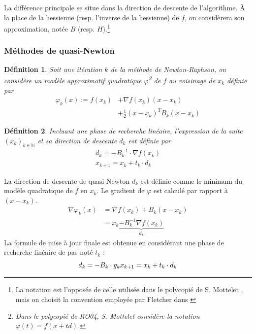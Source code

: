 \documentclass[3p, twocolumn]{elsarticle}
\newtheorem{definition}{Définition}[section]
\begin{document}
La différence principale se situe dans la direction de descente de l'algorithme. \`A la place de la hessienne (resp. l'inverse de la hessienne) de $f$, on considèrera son approximation, notée $B$ (resp. $H$).\footnote{La notation est l'opposée de celle utilisée dans le polycopié de S. Mottelet \cite{poly:mottelet2003}, mais on choisit la convention employée par Fletcher dans \cite{book:Fletcher_1987}}

\subsubsection{Méthodes de quasi-Newton}
\begin{definition}
    Soit une itération $k$ de la méthode de Newton-Raphson, on considère un modèle approximatif quadratique $\varphi$\footnote{Dans le polycopié de RO04, S. Mottelet \cite{poly:mottelet2003} considère la notation $\varphi(t) = f(x+td)$.} de $f$ au voisinage de $x_{k}$ définie par
    \begin{align}
        \varphi_k(x) := f(x_k) &+ \nabla f(x_k) (x - x_k)\nonumber\\ 
        &+ \frac12 (x-x_k)^T B_k (x-x_k)
        \label{eq:modele-quadra-qn}
    \end{align}
\end{definition}

\begin{definition}
    Incluant une phase de recherche linéaire, l'expression de la suite $(x_k)_{k\in \mathbb{N}}$ et sa direction de descente $d_k$ est définie par 
    \begin{align}
        d_k = -B_k^{-1}\cdot \nabla f(x_k)\nonumber \\
        x_{k+1} = x_k + t_k\cdot d_k
        \label{eq:suite-qn}
    \end{align}
\end{definition}

\begin{pf}
    La direction de descente de quasi-Newton $d_k$ est définie comme le minimum du modèle quadratique de $f$ en $x_k$. Le gradient de $\varphi$ est calculé par rapport à $(x - x_k)$. 
    \begin{align*}
        \nabla \varphi_k(x)&=\nabla f(x_k) + B_k(x-x_k)\\
        &= x_k \underbrace{- B_k^{-1}\nabla f(x_k)}_{d_k} 
    \end{align*}
    La formule de mise à jour finale est obtenue en considérant une phase de recherche linéaire de pas noté $t_k$ :
    \begin{equation}
        d_k = -B_k\cdot g_k \\
        x_{k+1} = x_k + t_k\cdot d_k
    \end{equation}
\end{pf}
\end{document}
